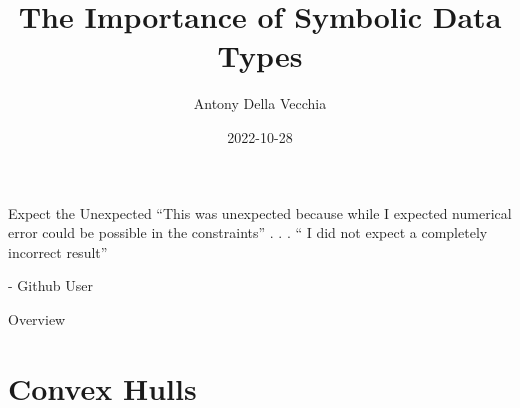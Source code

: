\documentclass[9pt]{beamer}
\author{Antony Della Vecchia}
\title{The Importance of Symbolic Data Types}
\institute[]{
Technische Universit\"at Berlin (MaRDI TA1 Computer Algebra)
}
\date{
2022-10-28
}
\theoremstyle{definition}
\begin{document}
\maketitle

\begin{frame}[fragile]{Expect the Unexpected}
  ``This was unexpected because while I expected numerical error could be possible in the constraints'' . . . `` I did not expect a completely incorrect result''
  \begin{flushright}- Github User
    \end{flushright}
\end{frame}


\begin{frame}[fragile]{Overview}
  \begin{tcolorbox}
    \tableofcontents
  \end{tcolorbox}
\end{frame}

\section{Convex Hulls}

\end{document}
